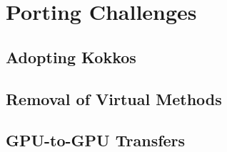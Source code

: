 \section{Porting Challenges}

\subsection{Adopting Kokkos}


\subsection{Removal of Virtual Methods}


\subsection{GPU-to-GPU Transfers}

